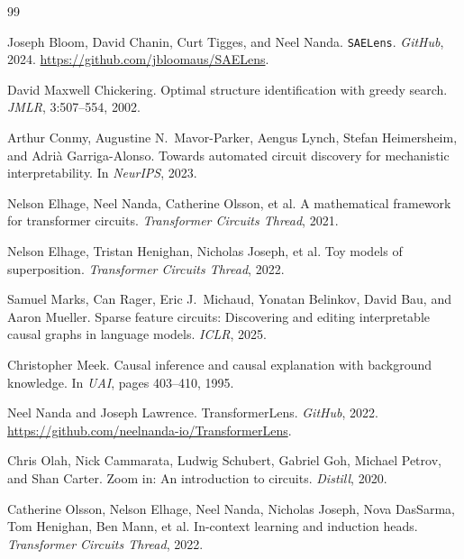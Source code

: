 \documentclass{article}
\begin{document}

\begin{thebibliography}{99}

Joseph Bloom, David Chanin, Curt Tigges, and Neel Nanda.
\newblock \texttt{SAELens}.
\newblock \emph{GitHub}, 2024.
\newblock \url{https://github.com/jbloomaus/SAELens}.

David Maxwell Chickering.
\newblock Optimal structure identification with greedy search.
\newblock \emph{JMLR}, 3:507--554, 2002.

Arthur Conmy, Augustine N.\ Mavor-Parker, Aengus Lynch, Stefan Heimersheim,
and Adri\`{a} Garriga-Alonso.
\newblock Towards automated circuit discovery for mechanistic interpretability.
\newblock In \emph{NeurIPS}, 2023.

Nelson Elhage, Neel Nanda, Catherine Olsson, et al.
\newblock A mathematical framework for transformer circuits.
\newblock \emph{Transformer Circuits Thread}, 2021.

Nelson Elhage, Tristan Henighan, Nicholas Joseph, et al.
\newblock Toy models of superposition.
\newblock \emph{Transformer Circuits Thread}, 2022.

Samuel Marks, Can Rager, Eric J.\ Michaud, Yonatan Belinkov, David Bau,
and Aaron Mueller.
\newblock Sparse feature circuits: Discovering and editing interpretable causal
graphs in language models.
\newblock \emph{ICLR}, 2025.

Christopher Meek.
\newblock Causal inference and causal explanation with background knowledge.
\newblock In \emph{UAI}, pages 403--410, 1995.

Neel Nanda and Joseph Lawrence.
\newblock TransformerLens.
\newblock \emph{GitHub}, 2022.
\newblock \url{https://github.com/neelnanda-io/TransformerLens}.

Chris Olah, Nick Cammarata, Ludwig Schubert, Gabriel Goh, Michael Petrov,
and Shan Carter.
\newblock Zoom in: An introduction to circuits.
\newblock \emph{Distill}, 2020.

Catherine Olsson, Nelson Elhage, Neel Nanda, Nicholas Joseph, Nova DasSarma,
Tom Henighan, Ben Mann, et al.
\newblock In-context learning and induction heads.
\newblock \emph{Transformer Circuits Thread}, 2022.


\end{thebibliography}
\end{document}
